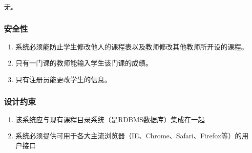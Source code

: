 无。
  
\subsubsection{安全性}
  
  \begin{enumerate}
    \item 系统必须能防止学生修改他人的课程表以及教师修改其他教师所开设的课程。
    \item 只有一门课的教师能输入学生该门课的成绩。
    \item 只有注册员能更改学生的信息。
  \end{enumerate}
  
\subsubsection{设计约束}
  
  \begin{enumerate}
    \item 该系统应与现有课程目录系统（是RDBMS数据库）集成在一起
    \item 系统必须提供可用于各大主流浏览器（IE、Chrome、Safari、Firefox等）的用户接口
  \end{enumerate}

